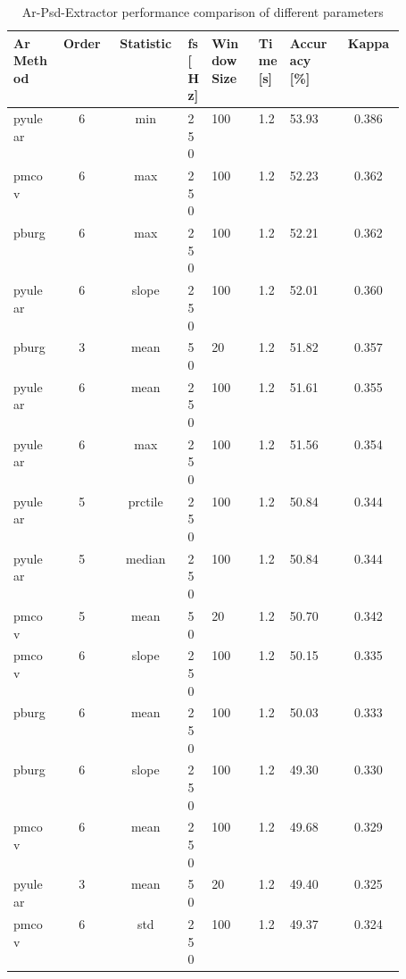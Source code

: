 \documentclass{article}
\begin{document}
\begin{table}[H]
 \centering
 \begin{tabular}{|C{0.12\linewidth}|c|c|C{0.05\linewidth}|C{0.12\linewidth}|C{0.08\linewidth}|C{0.14\linewidth}|c|}
 \hline
   \textbf{Ar Method} & \textbf{Order} & \textbf{Statistic} & \textbf{fs [Hz]} & \centering\textbf{Window Size} & \textbf{Time [s]} & \textbf{Accuracy [\%]} & \textbf{Kappa} \\\hline
   pyulear & 6 & min     & 250 & 100 & 1.2 & 53.93 & 0.386 \\
   pmcov   & 6 & max     & 250 & 100 & 1.2 & 52.23 & 0.362 \\
   pburg   & 6 & max     & 250 & 100 & 1.2 & 52.21 & 0.362 \\
   pyulear & 6 & slope   & 250 & 100 & 1.2 & 52.01 & 0.360 \\
   pburg   & 3 & mean    & 50  & 20  & 1.2 & 51.82 & 0.357 \\
   pyulear & 6 & mean    & 250 & 100 & 1.2 & 51.61 & 0.355 \\
   pyulear & 6 & max     & 250 & 100 & 1.2 & 51.56 & 0.354 \\
   pyulear & 5 & prctile & 250 & 100 & 1.2 & 50.84 & 0.344 \\
   pyulear & 5 & median  & 250 & 100 & 1.2 & 50.84 & 0.344 \\
   pmcov   & 5 & mean    & 50  & 20  & 1.2 & 50.70 & 0.342 \\
   pmcov   & 6 & slope   & 250 & 100 & 1.2 & 50.15 & 0.335 \\
   pburg   & 6 & mean    & 250 & 100 & 1.2 & 50.03 & 0.333 \\
   pburg   & 6 & slope   & 250 & 100 & 1.2 & 49.30 & 0.330 \\
   pmcov   & 6 & mean    & 250 & 100 & 1.2 & 49.68 & 0.329 \\
   pyulear & 3 & mean    & 50  & 20  & 1.2 & 49.40 & 0.325 \\
   pmcov   & 6 & std     & 250 & 100 & 1.2 & 49.37 & 0.324 \\\hline
 \end{tabular}
 \caption{Ar-Psd-Extractor performance comparison of different parameters}
 \label{tbl:ar-psd-feature-comparison-table}
\end{table}
\end{document}
